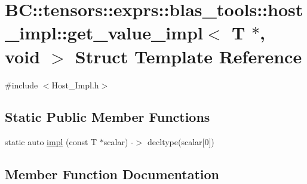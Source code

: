 \hypertarget{structBC_1_1tensors_1_1exprs_1_1blas__tools_1_1host__impl_1_1get__value__impl_3_01T_01_5_00_01void_01_4}{}\section{BC\+:\+:tensors\+:\+:exprs\+:\+:blas\+\_\+tools\+:\+:host\+\_\+impl\+:\+:get\+\_\+value\+\_\+impl$<$ T $\ast$, void $>$ Struct Template Reference}
\label{structBC_1_1tensors_1_1exprs_1_1blas__tools_1_1host__impl_1_1get__value__impl_3_01T_01_5_00_01void_01_4}


{\ttfamily \#include $<$Host\+\_\+\+Impl.\+h$>$}

\subsection*{Static Public Member Functions}
\begin{DoxyCompactItemize}
\item 
static auto \hyperlink{structBC_1_1tensors_1_1exprs_1_1blas__tools_1_1host__impl_1_1get__value__impl_3_01T_01_5_00_01void_01_4_a4d8ad9f27a720ba34252dea1bd8d5c3a}{impl} (const T $\ast$scalar) -\/$>$ decltype(scalar\mbox{[}0\mbox{]})
\end{DoxyCompactItemize}


\subsection{Member Function Documentation}
